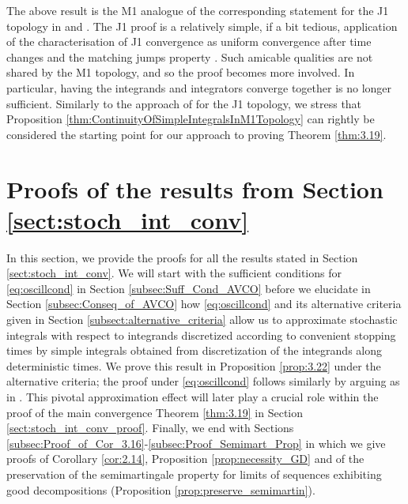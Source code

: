 \documentclass[11pt]{article}
\theoremstyle{definition}\newtheorem{example}[theorem]{Example}
\theoremstyle{definition}\newtheorem{counterexample}[theorem]{Counterexample}
\theoremstyle{definition}\newtheorem{remark}[theorem]{Remark}
\theoremstyle{definition}\newtheorem{defi}[theorem]{Definition}
\numberwithin{equation}{section}
\renewcommand{\|}{\; : \, \;}											%
\begin{document}
The above result is the M1 analogue of the corresponding statement for the J1 topology in \cite[Eq.~(7.18)]{graham} and \cite[Eqs.~(1.12)-(1.13)]{kurtzprotter}. The J1 proof is a relatively simple, if a bit tedious, application of the characterisation of J1 convergence as uniform convergence after time changes \cite[Thm.~VI.1.15]{shiryaev} and the matching jumps property \cite[Prop.~VI.2.1]{shiryaev}. Such amicable qualities are not shared by the M1 topology, and so the proof becomes more involved. In particular, having the integrands and integrators converge together is no longer sufficient. Similarly to the approach of \cite{kurtzprotter} for the J1 topology, we stress that Proposition \ref{thm:ContinuityOfSimpleIntegralsInM1Topology} can rightly be considered the starting point for our approach to proving Theorem \ref{thm:3.19}.














\section{Proofs of the results from Section \ref{sect:stoch_int_conv}}\label{sect:proofs_sect3} 

In this section, we provide the proofs for all the results stated in Section \ref{sect:stoch_int_conv}. We will start with the sufficient conditions for \eqref{eq:oscillcond} in Section \ref{subsec:Suff_Cond_AVCO} before we elucidate in Section \ref{subsec:Conseq_of_AVCO} how \eqref{eq:oscillcond} and its alternative criteria given in Section \ref{subsect:alternative_criteria} allow us to approximate stochastic integrals with respect to integrands discretized according to convenient stopping times by simple integrals obtained from discretization of the integrands along deterministic times. We prove this result in Proposition \ref{prop:3.22}  under the alternative criteria; the proof under \ref{eq:oscillcond} follows similarly by arguing as in \cite{jakubowski}. This pivotal approximation effect will later play a crucial role within the proof of the main convergence Theorem \ref{thm:3.19} in Section \ref{sect:stoch_int_conv_proof}. Finally, we end with Sections \ref{subsec:Proof_of_Cor_3.16}-\ref{subsec:Proof_Semimart_Prop} in which we give proofs of Corollary \ref{cor:2.14}, Proposition \ref{prop:necessity_GD} and of the preservation of the semimartingale property for limits of sequences exhibiting good decompositions (Proposition \ref{prop:preserve_semimartin}). 
\end{document}
